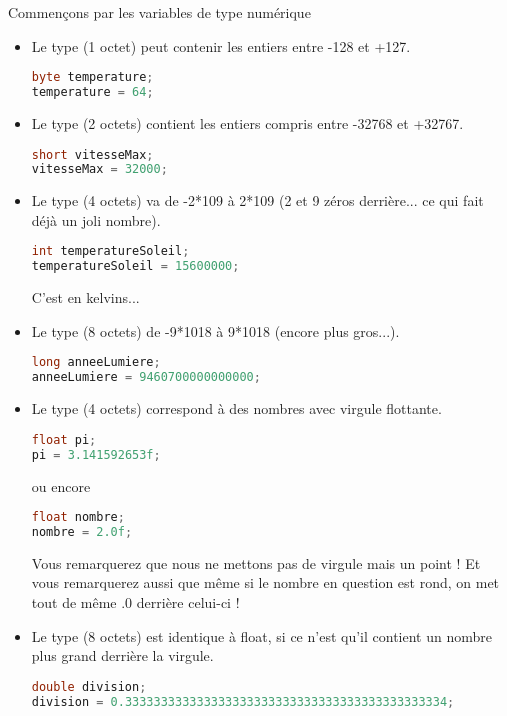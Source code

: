 \documentclass[a4paper,twoside]{article}
\begin{document}
Commençons par les variables de type numérique
\begin{itemize}
\item Le type  (1 octet) peut contenir les entiers entre -128 et +127.
\begin{lstlisting}[language=java]
byte temperature;
temperature = 64;
\end{lstlisting}

\item Le type  (2 octets) contient les entiers compris entre -32768 et +32767.
\begin{lstlisting}[language=java]
short vitesseMax;
vitesseMax = 32000;
\end{lstlisting}

\item Le type  (4 octets) va de -2*109 à 2*109 (2 et 9 zéros derrière... ce qui fait déjà un joli nombre).
\begin{lstlisting}[language=java]
int temperatureSoleil;
temperatureSoleil = 15600000;
\end{lstlisting}
C'est en kelvins...

\item Le type (8 octets) de -9*1018 à 9*1018 (encore plus gros...).
\begin{lstlisting}[language=java]
long anneeLumiere;
anneeLumiere = 9460700000000000;
\end{lstlisting}

\item Le type  (4 octets) correspond à des nombres avec virgule flottante.
\begin{lstlisting}[language=java]
float pi;
pi = 3.141592653f;
\end{lstlisting}
ou encore
\begin{lstlisting}[language=java]
float nombre;
nombre = 2.0f;
\end{lstlisting}

Vous remarquerez que nous ne mettons pas de virgule mais un point ! Et vous remarquerez aussi que même si le nombre en question est rond, on met tout de même .0 derrière celui-ci !

\item Le type  (8 octets) est identique à float, si ce n'est qu'il contient un nombre plus grand derrière la virgule.
\begin{lstlisting}[language=java]
double division;
division = 0.333333333333333333333333333333333333333333334;
\end{lstlisting}
\end{itemize}
\end{document}
